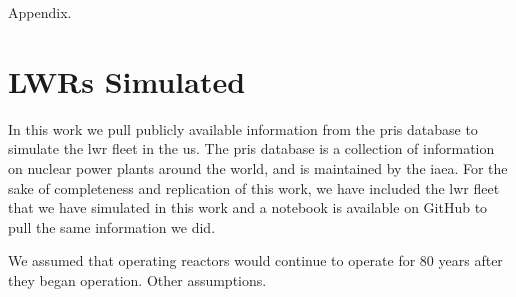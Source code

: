 Appendix.

\section{LWRs Simulated}
\label{app:lwrs}

In this work we pull publicly available information from the \gls{pris} database to simulate the \gls{lwr} fleet in the \gls{us}. The \gls{pris} database is a collection of information on nuclear power plants around the world, and is maintained by the \gls{iaea}. For the sake of completeness and replication of this work, we have included the \gls{lwr} fleet that we have simulated in this work and a notebook is available on GitHub to pull the same information we did.

We assumed that operating reactors would continue to operate for 80 years after they began operation. Other assumptions.

